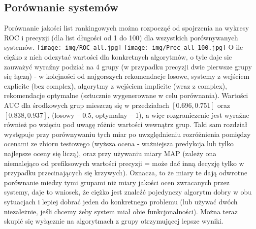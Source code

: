 \documentclass{pracamgr}
\begin{document}
   \subsection{Porównanie systemów}
    Porównanie jakości list rankingowych można rozpocząć od spojrzenia na wykresy ROC i precyzji (dla list długości od 1 do 100)
    dla wszystkich porównywanych systemów.\newline
    \texttt{[image: img/ROC\_all.jpg]}
    \texttt{[image: img/Prec\_all\_100.jpg]}\newline
    O ile ciężko z nich odczytać wartości dla konkretnych algorytmów, o tyle daje sie zauważyć wyraźny podział na 4 grupy
    (w przypadku precyzji dwie pierwsze grupy się łączą) - w kolejności od najgorszych
    rekomendacje losowe, systemy z wejściem explicite (bez complex), algorytmy z wejściem implicite (wraz z complex), rekomendacje optymalne
    (sztucznie wygenerowane w celu porównania). Wartości AUC dla środkowych grup mieszczą się w przedziałach $[0.696,0.751]$ oraz $[0.838,0.937]$,
    (losowy -- 0.5, optymalny -- 1), a więc rozgraniczenie jest wyraźne również po wzięciu pod uwagę różnic wartości wewnątrz grup.
    Taki sam rozdział występuje przy porównywaniu tych miar po uwzględnieniu rozróżnienia pomiędzy ocenami
    ze zbioru testowego (wyższa ocena - ważniejsza predykcja lub tylko najlepsze oceny się liczą), oraz przy używaniu miary MAP
    (zależy ona niemalejąco od prefiksowych wartości precyzji = może dać inną decyzję tylko w przypadku przecinających się krzywych).
    Oznacza, to że miary te dają odwrotne porównanie miedzy tymi grupami niż miary jakości ocen zwracanych przez systemy, daje to wniosek,
    że ciężko jest znaleźć pojedynczy algorytm dobry w obu sytuacjach i lepiej dobrać jeden do konkretnego problemu
    (lub używać dwóch niezależnie, jeśli chcemy żeby system miał obie funkcjonalności).
    Można teraz skupić się wyłącznie na algorytmach z grupy otrzymującej lepsze wyniki.\newline
\end{document}
